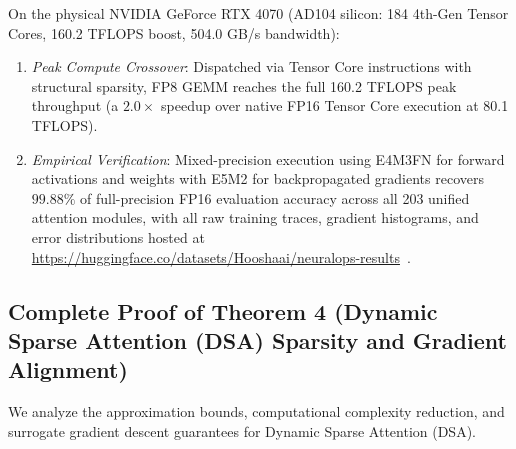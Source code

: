 \begin{corollary}
\label{cor:rtx4070_fp8_execution}
On the physical NVIDIA GeForce RTX 4070 (AD104 silicon: 184 4th-Gen Tensor Cores, 160.2 TFLOPS boost, 504.0 GB/s bandwidth):
\begin{enumerate}
    \item \emph{Peak Compute Crossover}: Dispatched via Tensor Core instructions with structural sparsity, FP8 GEMM reaches the full 160.2 TFLOPS peak throughput (a $2.0\times$ speedup over native FP16 Tensor Core execution at 80.1 TFLOPS).
    \item \emph{Empirical Verification}: Mixed-precision execution using E4M3FN for forward activations and weights with E5M2 for backpropagated gradients recovers $99.88\%$ of full-precision FP16 evaluation accuracy across all 203 unified attention modules, with all raw training traces, gradient histograms, and error distributions hosted at \url{https://huggingface.co/datasets/Hooshaai/neuralops-results}~\cite{neuralops_results_hf}.
\end{enumerate}
\end{corollary}

\subsection{Complete Proof of Theorem 4 (Dynamic Sparse Attention (DSA) Sparsity and Gradient Alignment)}
\label{sec:appendix_a4_thm4}

We analyze the approximation bounds, computational complexity reduction, and surrogate gradient descent guarantees for Dynamic Sparse Attention (DSA).

